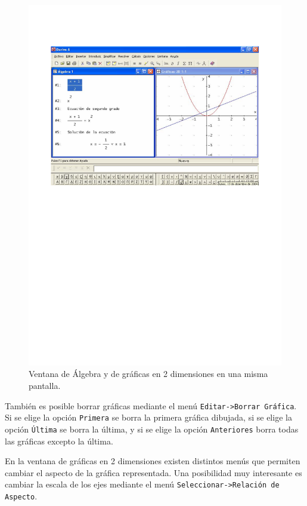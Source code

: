 \begin{figure}[h!]
\begin{center}
\includegraphics[scale=0.9]{img/introduccion_derive/expresionesygraficas}
\caption{Ventana de Álgebra y de gráficas en 2 dimensiones en una
misma pantalla.} \label{g:expresionesygraficas}
\end{center}
\end{figure}

También es posible borrar gráficas mediante el menú
\texttt{Editar->Borrar Gráfica}. Si se elige la opción
\texttt{Primera} se borra la primera gráfica dibujada, si se elige
la opción \texttt{Última} se borra la última, y si se elige la
opción \texttt{Anteriores} borra todas las gráficas excepto la
última.

En la ventana de gráficas en 2 dimensiones existen distintos menús
que permiten cambiar el aspecto de la gráfica representada. Una
posibilidad muy interesante es cambiar la escala de los ejes
mediante el menú \texttt{Seleccionar->Relación de Aspecto}.

